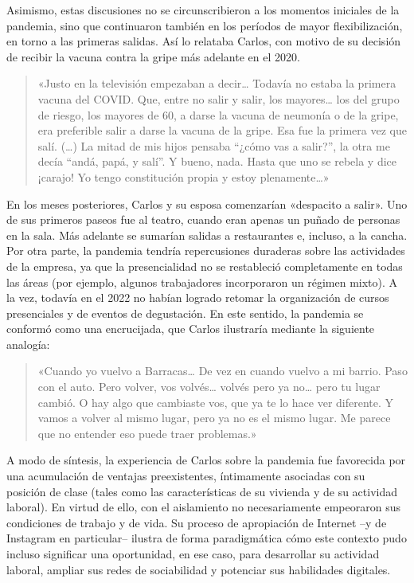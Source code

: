Asimismo, estas discusiones no se circunscribieron a los momentos iniciales de la pandemia, sino que continuaron también en los períodos de mayor flexibilización, en torno a las primeras salidas. Así lo relataba Carlos, con motivo de su decisión de recibir la vacuna contra la gripe más adelante en el 2020.

\begin{quote}
«Justo en la televisión empezaban a decir\ldots{} Todavía no estaba la primera vacuna del COVID. Que, entre no salir y salir, los mayores\ldots{} los del grupo de riesgo, los mayores de 60, a darse la vacuna de neumonía o de la gripe, era preferible salir a darse la vacuna de la gripe. Esa fue la primera vez que salí. (\ldots) La mitad de mis hijos pensaba ``¿cómo vas a salir?'', la otra me decía ``andá, papá, y salí''. Y bueno, nada. Hasta que uno se rebela y dice ¡carajo! Yo tengo constitución propia y estoy plenamente\ldots»
\end{quote}

En los meses posteriores, Carlos y su esposa comenzarían «despacito a salir». Uno de sus primeros paseos fue al teatro, cuando eran apenas un puñado de personas en la sala. Más adelante se sumarían salidas a restaurantes e, incluso, a la cancha. Por otra parte, la pandemia tendría repercusiones duraderas sobre las actividades de la empresa, ya que la presencialidad no se restableció completamente en todas las áreas (por ejemplo, algunos trabajadores incorporaron un régimen mixto). A la vez, todavía en el 2022 no habían logrado retomar la organización de cursos presenciales y de eventos de degustación. En este sentido, la pandemia se conformó como una encrucijada, que Carlos ilustraría mediante la siguiente analogía:

\begin{quote}
«Cuando yo vuelvo a Barracas\ldots{} De vez en cuando vuelvo a mi barrio. Paso con el auto. Pero volver, vos volvés\ldots{} volvés pero ya no\ldots{} pero tu lugar cambió. O hay algo que cambiaste vos, que ya te lo hace ver diferente. Y vamos a volver al mismo lugar, pero ya no es el mismo lugar. Me parece que no entender eso puede traer problemas.»
\end{quote}

A modo de síntesis, la experiencia de Carlos sobre la pandemia fue favorecida por una acumulación de ventajas preexistentes, íntimamente asociadas con su posición de clase (tales como las características de su vivienda y de su actividad laboral). En virtud de ello, con el aislamiento no necesariamente empeoraron sus condiciones de trabajo y de vida. Su proceso de apropiación de Internet --y de Instagram en particular-- ilustra de forma paradigmática cómo este contexto pudo incluso significar una oportunidad, en ese caso, para desarrollar su actividad laboral, ampliar sus redes de sociabilidad y potenciar sus habilidades digitales.

